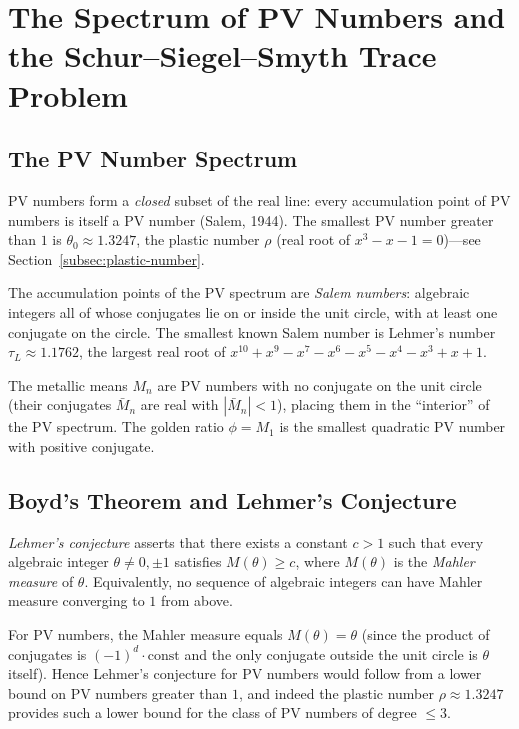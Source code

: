 \section{The Spectrum of PV Numbers and the Schur--Siegel--Smyth Trace Problem}
\label{sec:pv-spectrum}

\subsection{The PV Number Spectrum}
\label{subsec:pv-spectrum}

PV numbers form a \emph{closed} subset of the
real line: every accumulation point of PV numbers
is itself a PV number (Salem, 1944).  The smallest
PV number greater than $1$ is $\theta_0 \approx 1.3247$,
the plastic number $\rho$ (real root of
$x^3 - x - 1 = 0$)---see
Section~\ref{subsec:plastic-number}.

The accumulation points of the PV spectrum are
\emph{Salem numbers}: algebraic integers all of
whose conjugates lie on or inside the unit circle,
with at least one conjugate on the circle.  The
smallest known Salem number is Lehmer's number
$\tau_L \approx 1.1762$, the largest real root
of $x^{10} + x^9 - x^7 - x^6 - x^5 - x^4 - x^3 + x + 1$.

The metallic means $M_n$ are PV numbers with
no conjugate on the unit circle (their conjugates
$\bar{M}_n$ are real with $|\bar{M}_n| < 1$),
placing them in the ``interior'' of the PV
spectrum.  The golden ratio $\phi = M_1$ is the
smallest quadratic PV number with positive
conjugate.

\subsection{Boyd's Theorem and Lehmer's Conjecture}
\label{subsec:boyd-lehmer}

\emph{Lehmer's conjecture} asserts that there
exists a constant $c > 1$ such that every
algebraic integer $\theta \neq 0, \pm 1$ satisfies
$M(\theta) \geq c$, where $M(\theta)$ is the
\emph{Mahler measure} of $\theta$.  Equivalently,
no sequence of algebraic integers can have Mahler
measure converging to $1$ from above.

For PV numbers, the Mahler measure equals
$M(\theta) = \theta$ (since the product of
conjugates is $(-1)^d \cdot \text{const}$ and the
only conjugate outside the unit circle is $\theta$
itself).  Hence Lehmer's conjecture for PV numbers
would follow from a lower bound on PV numbers
greater than $1$, and indeed the plastic number
$\rho \approx 1.3247$ provides such a lower bound
for the class of PV numbers of degree $\leq 3$.


